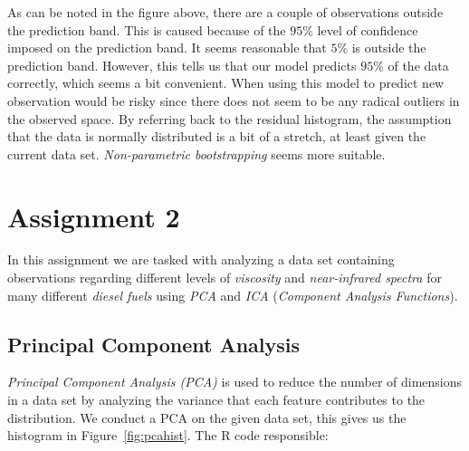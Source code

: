 \documentclass[a4paper,12pt]{article}
\begin{document}
        As can be noted in the figure above, there are a couple of observations outside the prediction band. This is caused because of the $95 \%$ level of confidence imposed on the prediction band. It seems reasonable that $5 \%$ is outside the prediction band. However, this tells us that our model predicts $95 \%$ of the data correctly, which seems a bit convenient. When using this model to predict new observation would be risky since there does not seem to be any radical outliers in the observed space. By referring back to the residual histogram, the assumption that the data is normally distributed is a bit of a stretch, at least given the current data set.  \emph{Non-parametric bootstrapping} seems more suitable.

    \section*{Assignment 2}

        In this assignment we are tasked with analyzing a data set containing observations regarding different levels of \emph{viscosity} and \emph{near-infrared spectra} for many different \emph{diesel fuels} using \emph{PCA} and \emph{ICA} (\emph{Component Analysis Functions}).

    \subsection*{Principal Component Analysis}

        \emph{Principal Component Analysis (PCA)} is used to reduce the number of dimensions in a data set by analyzing the variance that each feature contributes to the distribution. We conduct a PCA on the given data set, this gives us the histogram in Figure~\ref{fig:pcahist}. The R code responsible:

        
\end{document}
